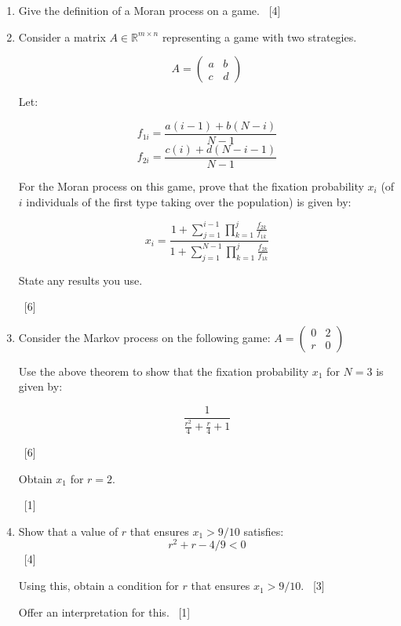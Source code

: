 \documentclass[12pt,a4paper]{article}
\makeatletter
\renewcommand{\@oddfoot}{\hfil \arabic{page} \hfil}    %
\makeatother
\begin{document}
\begin{enumerate}
    \begin{enumerate}
        \item Give the definition of a Moran process on a game.
            ~\hfill{[4]}
		\item Consider a matrix $A\in\mathbb{R}^{m\times n}$ representing a
game with two strategies.

			$$ A= \begin{pmatrix} a & b\\ c & d \end{pmatrix} $$

			Let:

			$$f_{1i}=\frac{a(i-1)+b(N-i)}{N-1}$$
$$f_{2i}=\frac{c(i)+d(N-i-1)}{N-1}$$

			For the Moran process on this game, prove that the fixation
probability \(x_i\) (of \(i\) individuals of the first type taking over the
population) is given by:

			$$
x_i=\frac{1+\sum_{j=1}^{i-1}\prod_{k=1}^j\frac{f_{2k}}{f_{1k}}}{1+\sum_{j=1}^{N-1}\prod_{k=1}^j\frac{f_{2k}}{f_{1k}}}
$$

             State any results you use.

            ~\hfill{[6]}
        \item Consider the Markov process on the following game:
        \(A = \begin{pmatrix} 0 & 2\\ r & 0 \end{pmatrix}\)

            Use the above theorem to show that the fixation probability \(x_1\)
            for \(N=3\) is given by:

            \[
                \frac{1}{\frac{r^{2}}{4} + \frac{r}{4} + 1}
            \]

            ~\hfill{[6]}

            Obtain \(x_1\) for \(r=2\).

            ~\hfill{[1]}


        \item Show that a value of \(r\) that ensures \(x_1>9/10\) satisfies:
            \[
                r ^ 2 + r - 4 / 9 < 0
            \]
            ~\hfill{[4]}

            Using this, obtain a condition for \(r\) that ensures
            \(x_1>9/10\).
            ~\hfill{[3]}

            Offer an interpretation for this.
            ~\hfill{[1]}


    \end{enumerate}
\end{enumerate}


\makeatletter
\renewcommand{\@oddfoot}{\hfil \arabic{page}X \hfil}    %
\makeatother
\end{document}
